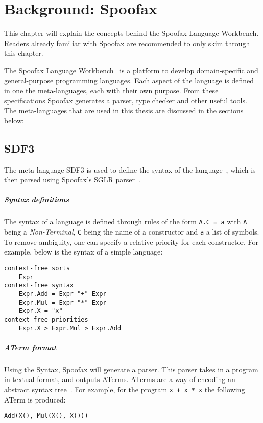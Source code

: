 \chapter{\label{chap:bg-spoofax}Background: Spoofax}

This chapter will explain the concepts behind the Spoofax Language Workbench. Readers already familiar with Spoofax are recommended to only skim through this chapter.

The Spoofax Language Workbench~\cite{spoofax} is a platform to develop domain-specific and
general-purpose programming languages. Each aspect of the language is defined in one the meta-languages, each with their own purpose. From these specifications Spoofax generates a parser, type checker and other useful tools. The meta-languages that are used in this thesis are discussed in the sections below:

\section{SDF3}

The meta-language SDF3 is used to define the syntax of the language~\cite{sdf3}, which is then parsed using Spoofax's SGLR parser~\cite{sdf3_parser}.

\paragraph{Syntax definitions}
The syntax of a language is defined through rules of the form \verb|A.C = a| with \verb|A| being a \emph{Non-Terminal}, \verb|C| being the name of a constructor and \verb|a| a list of symbols. To remove ambiguity, one can specify a relative priority for each constructor. For example, below is the syntax of a simple language:
\begin{lstlisting}
context-free sorts
	Expr
context-free syntax
	Expr.Add = Expr "+" Expr
	Expr.Mul = Expr "*" Expr
	Expr.X = "x"
context-free priorities
	Expr.X > Expr.Mul > Expr.Add
\end{lstlisting}

\paragraph{ATerm format}
Using the Syntax, Spoofax will generate a parser. This parser takes in a program in textual format, and outputs ATerms. ATerms are a way of encoding an abstract syntax tree~\cite{aterm}. For example, for the program \verb|x + x * x| the following ATerm is produced:
\begin{lstlisting}
Add(X(), Mul(X(), X()))
\end{lstlisting}

